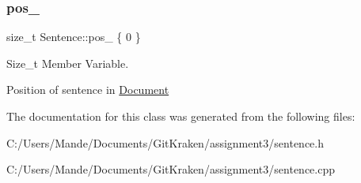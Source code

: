 \subsubsection{\texorpdfstring{pos\+\_\+}{pos\_}}
{\footnotesize\ttfamily size\+\_\+t Sentence\+::pos\+\_\+ \{ 0 \}\hspace{0.3cm}{\ttfamily [private]}}



Size\+\_\+t Member Variable. 

Position of sentence in \hyperlink{class_document}{Document} 

The documentation for this class was generated from the following files\+:\begin{DoxyCompactItemize}
\item 
C\+:/\+Users/\+Mande/\+Documents/\+Git\+Kraken/assignment3/sentence.\+h\item 
C\+:/\+Users/\+Mande/\+Documents/\+Git\+Kraken/assignment3/sentence.\+cpp\end{DoxyCompactItemize}
